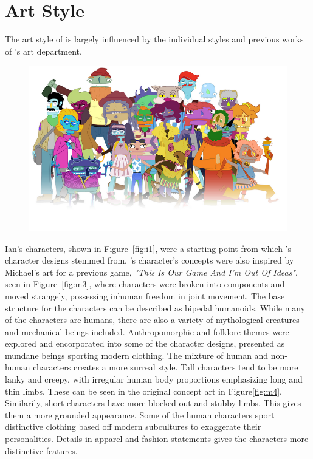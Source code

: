 \section{Art Style}
The art style of \ourgame{} is largely influenced by the individual styles and previous works of \ourteam{}'s art department.

\begin{figure}[H]
\centering\includegraphics[width=0.7\linewidth]{images/art_style}
\end{figure}

\clearpage
Ian's characters, shown in Figure~\ref{fig:i1}, were a starting point from which \ourgame{}'s character designs stemmed from. \ourgame{}'s character's concepts were also inspired by Michael's art for a previous game, \textit{"This Is Our Game And I'm Out Of Ideas"}, seen in Figure~\ref{fig:m3}, where characters were broken into components and moved strangely, possessing inhuman freedom in joint movement. 
The base structure for the characters can be described as bipedal humanoids. While many of the characters are humans, there are also a variety of mythological creatures and mechanical beings included. Anthropomorphic and folklore themes were explored and encorporated into some of the character designs, presented as mundane beings sporting modern clothing. The mixture of human and non-human characters creates a more surreal style. 
Tall characters tend to be more lanky and creepy, with irregular human body proportions emphasizing long and thin limbs. These can be seen in the original concept art in Figure\ref{fig:m4}. Similarily, short characters have more blocked out and stubby limbs. This gives them a more grounded appearance. Some of the human characters sport distinctive clothing based off modern subcultures to exaggerate their personalities. Details in apparel and fashion statements gives the characters more distinctive features.



